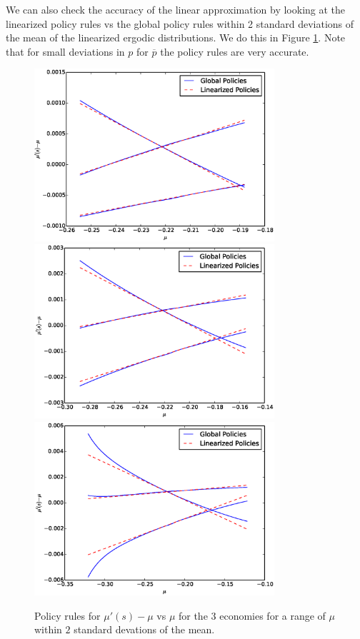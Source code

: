 \documentclass[12pt]{article}
\newcommand{\pbar}{{\overline p}}
\begin{document}
We can also check the accuracy of the linear approximation by looking at the linearized policy rules vs the global policy rules within 2 standard deviations of the mean of the linearized ergodic distributions.  We do this in Figure \ref{fig.pol_plot}.  Note that for small deviations in $p$ for $\pbar$ the policy rules are very accurate.
\begin{figure}[ht]
	\includegraphics[width=3.5in]{Images/pol1.eps}
	\includegraphics[width=3.5in]{Images/pl2.eps}
	\includegraphics[width=3.5in]{Images/pol3.eps}
	\caption{Policy rules for $\mu'(s)-\mu$ vs $\mu$ for the 3 economies for a range of $\mu$ within $2$ standard devations of the mean.\label{fig.pol_plot}}
\end{figure}
\end{document}
